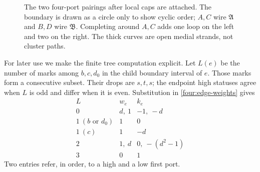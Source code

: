 \begin{figure}[htbp]
\centering
{}
\caption{The two four-port pairings after local caps are attached.
The boundary is drawn as a circle only to show cyclic order; $A,C$
wire $\mathfrak A$ and $B,D$ wire $\mathfrak B$.  Completing around
$A,C$ adds one loop on the left and two on the right.  The thick curves
are open medial strands, not cluster paths.}
\label{four:pairing-figure}
\end{figure}

For later use we make the finite tree computation explicit.  Let $L(e)$
be the number of marks among $b,c,d_0$ in the child boundary interval of
$e$.  Those marks form a consecutive subset.  Their drops are $s,t,s$;
the endpoint high statuses agree when $L$ is odd and differ when it is
even.  Substitution in \eqref{four:edge-weights} gives
\begin{equation}
\begin{array}{c|cc}
 L&w_e&k_e\\ \hline
 0&d,\ 1&-1,\ -d\\
 1\ (b\text{ or }d_0)&1&0\\
 1\ (c)&1&-d\\
 2&1,\ d&0,\ -(d^2-1)\\
 3&0&1
\end{array}
\label{four:table}
\end{equation}
Two entries refer, in order, to a high and a low first port.

